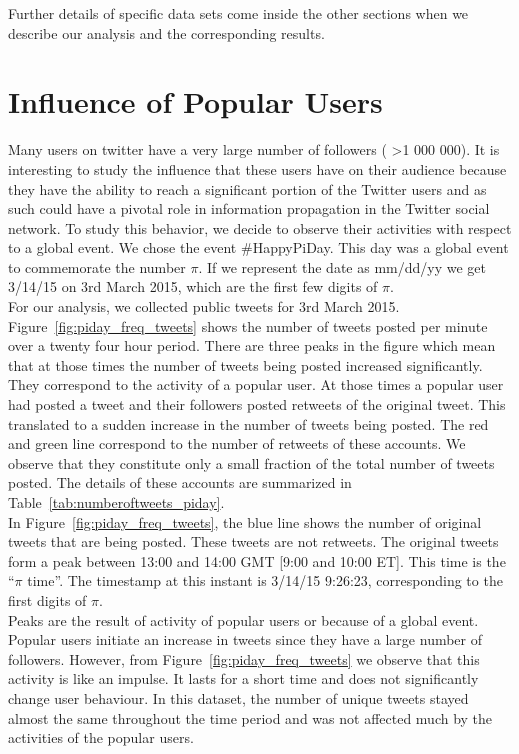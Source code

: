\documentclass[journal, a4paper, 12pt]{article}
\begin{document}
Further details of specific data sets come inside the other sections when we describe our analysis and the corresponding results.


\section{Influence of Popular Users}

Many users on twitter have a very large number of followers ( \textgreater 1 000 000). It is interesting to study the influence that these users have on their audience because they have the ability to reach a significant portion of the Twitter users and as such could have a pivotal role in information propagation in the Twitter social network. To study this behavior, we decide to observe their activities with respect to a global event. We chose the event \#HappyPiDay. This day was a global event to commemorate the number  $\pi$. If we represent the date as mm/dd/yy we get 3/14/15 on 3rd March 2015, which are the first few digits of $\pi$.
\\

For our analysis, we collected public tweets for 3rd March 2015. Figure~\ref{fig:piday_freq_tweets} shows the number of tweets posted per minute over a twenty four hour period. There are three peaks in the figure which mean that at those times the number of tweets being posted increased significantly.
They correspond to the activity of a popular user. At those times a popular user had posted a tweet and their followers posted retweets of the original tweet. This translated to a sudden increase in the number of tweets being posted. The red and green line correspond to the number of retweets of these accounts. We observe that they constitute only a small fraction of the total number of tweets posted. The details of these accounts are summarized in Table~\ref{tab:numberoftweets_piday}. 
\\

In Figure~\ref{fig:piday_freq_tweets}, the blue line shows the number of original tweets that are being posted. These tweets are not retweets. The original tweets form a peak between 13:00 and 14:00 GMT [9:00 and 10:00 ET]. This time is the ``$\pi$ time''. The timestamp at this instant is 3/14/15 9:26:23, corresponding to the first digits of $\pi$.
\\

Peaks are the result of activity of popular users or because of a global event. Popular users initiate an increase in tweets since they have a large number of followers. However, from Figure~\ref{fig:piday_freq_tweets} we observe that this activity is like an impulse. It lasts for a short time and does not significantly change user behaviour. In this dataset, the number of unique tweets stayed almost the same throughout the time period and was not affected much by the activities of the popular users.
\\
      
\end{document}
